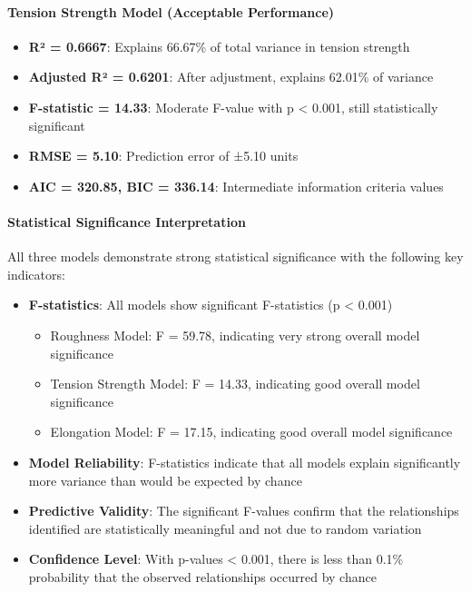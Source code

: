 \paragraph{Tension Strength Model (Acceptable Performance)}
\begin{itemize}
    \item \textbf{R² = 0.6667}: Explains 66.67\% of total variance in tension strength
    \item \textbf{Adjusted R² = 0.6201}: After adjustment, explains 62.01\% of variance
    \item \textbf{F-statistic = 14.33}: Moderate F-value with p < 0.001, still statistically significant
    \item \textbf{RMSE = 5.10}: Prediction error of ±5.10 units
    \item \textbf{AIC = 320.85, BIC = 336.14}: Intermediate information criteria values
\end{itemize}

\paragraph{Statistical Significance Interpretation}
All three models demonstrate strong statistical significance with the following key indicators:

\begin{itemize}
    \item \textbf{F-statistics}: All models show significant F-statistics (p < 0.001)
    \begin{itemize}
        \item Roughness Model: F = 59.78, indicating very strong overall model significance
        \item Tension Strength Model: F = 14.33, indicating good overall model significance
        \item Elongation Model: F = 17.15, indicating good overall model significance
    \end{itemize}
    \item \textbf{Model Reliability}: F-statistics indicate that all models explain significantly more variance than would be expected by chance
    \item \textbf{Predictive Validity}: The significant F-values confirm that the relationships identified are statistically meaningful and not due to random variation
    \item \textbf{Confidence Level}: With p-values < 0.001, there is less than 0.1\% probability that the observed relationships occurred by chance
\end{itemize}

